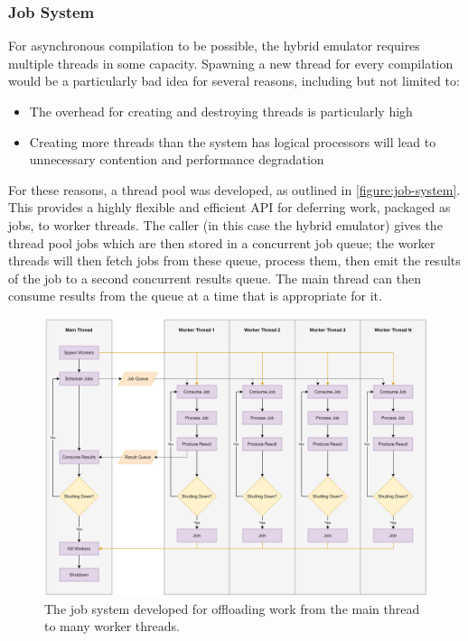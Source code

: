 \subsubsection{Job System}
\label{section:job-system}

For asynchronous compilation to be possible, the hybrid emulator requires multiple threads in some capacity. Spawning a new thread for every compilation would be a particularly bad idea for several reasons, including but not limited to:

\begin{itemize}
    \item The overhead for creating and destroying threads is particularly high
    \item Creating more threads than the system has logical processors will lead to unnecessary contention and performance degradation
\end{itemize}

For these reasons, a thread pool was developed, as outlined in \autoref{figure:job-system}. This provides a highly flexible and efficient API for deferring work, packaged as jobs, to worker threads. The caller (in this case the hybrid emulator) gives the thread pool jobs which are then stored in a concurrent job queue; the worker threads will then fetch jobs from these queue, process them, then emit the results of the job to a second concurrent results queue. The main thread can then consume results from the queue at a time that is appropriate for it.

\begin{figure}[h]
    \centering
    \includegraphics[width=1\linewidth]{diagrams/thread-pool.png}
    \caption{The job system developed for offloading work from the main thread to many worker threads.}
    \label{figure:job-system}
\end{figure}


